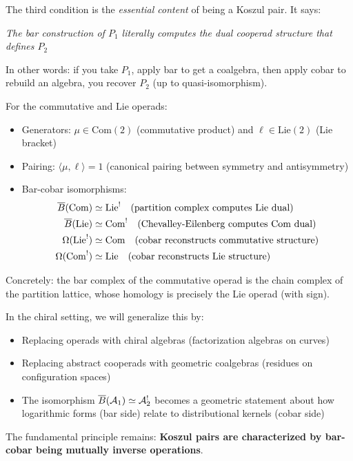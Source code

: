 \begin{remark}
The third condition is the \emph{essential content} of being a Koszul pair. It says:
\begin{center}
\textit{The bar construction of $P_1$ literally computes the dual cooperad structure that defines $P_2$}
\end{center}

In other words: if you take $P_1$, apply bar to get a coalgebra, then apply cobar to rebuild an algebra, you recover $P_2$ (up to quasi-isomorphism).
\end{remark}

\begin{example}
For the commutative and Lie operads:
\begin{itemize}
\item Generators: $\mu \in \text{Com}(2)$ (commutative product) and $\ell \in \text{Lie}(2)$ (Lie bracket)
\item Pairing: $\langle \mu, \ell \rangle = 1$ (canonical pairing between symmetry and antisymmetry)
\item Bar-cobar isomorphisms:
\begin{align*}
\overline{B}(\text{Com}) &\simeq \text{Lie}^! \quad \text{(partition complex computes Lie dual)} \\
\overline{B}(\text{Lie}) &\simeq \text{Com}^! \quad \text{(Chevalley-Eilenberg computes Com dual)} \\
\Omega(\text{Lie}^!) &\simeq \text{Com} \quad \text{(cobar reconstructs commutative structure)} \\
\Omega(\text{Com}^!) &\simeq \text{Lie} \quad \text{(cobar reconstructs Lie structure)}
\end{align*}
\end{itemize}

Concretely: the bar complex of the commutative operad is the chain complex of the partition lattice, whose homology is precisely the Lie operad (with sign).
\end{example}

\begin{remark}
In the chiral setting, we will generalize this by:
\begin{itemize}
\item Replacing operads with chiral algebras (factorization algebras on curves)
\item Replacing abstract cooperads with geometric coalgebras (residues on configuration spaces)
\item The isomorphism $\overline{B}(\mathcal{A}_1) \simeq \mathcal{A}_2^!$ becomes a geometric statement about how logarithmic forms (bar side) relate to distributional kernels (cobar side)
\end{itemize}
The fundamental principle remains: \textbf{Koszul pairs are characterized by bar-cobar being mutually inverse operations}.
\end{remark}

